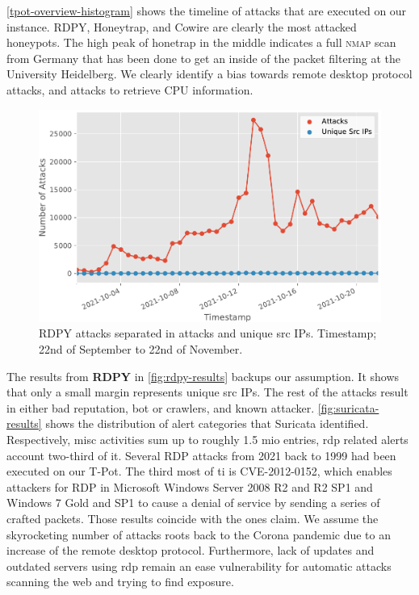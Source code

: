 \autoref{tpot-overview-histogram} shows the timeline of attacks that are executed on our instance.
RDPY, Honeytrap, and Cowire are clearly the most attacked honeypots.
The high peak of honetrap in the middle indicates a full \textsc{nmap} scan from Germany that has been done to get an inside of the packet filtering at the University Heidelberg.
We clearly identify a bias towards remote desktop protocol attacks, and attacks to retrieve CPU information. %

\begin{figure}[ht]
    \centering
    \includegraphics[width=\textwidth]{figures/tpot-rdpy-port.pdf}
    \caption[RDPY results of T-Pot]{RDPY attacks separated in attacks and unique src IPs. Timestamp; 22nd of September to 22nd of November.}
    \label{fig:rdpy-results}
\end{figure}

The results from \textbf{RDPY} in \autoref{fig:rdpy-results} backups our assumption.
It shows that only a small margin represents unique src IPs.
The rest of the attacks result in either bad reputation, bot or crawlers, and known attacker.
\autoref{fig:suricata-results} shows the distribution of alert categories that Suricata identified.
Respectively, misc activities sum up to roughly 1.5 mio entries, \ac{rdp} related alerts account two-third of it.
Several RDP attacks from 2021 back to 1999 had been executed on our T-Pot.
The third most of ti is CVE-2012-0152, which enables attackers for RDP in Microsoft Windows Server 2008 R2 and R2 SP1 and Windows 7 Gold and SP1 to cause a denial of service by sending a series of crafted packets.
Those results coincide with the ones \citet{Kelly2021} claim.
We assume the skyrocketing number of attacks roots back to the Corona pandemic due to an increase of the remote desktop protocol.
Furthermore, lack of updates and outdated servers using \ac{rdp} remain an ease vulnerability for automatic attacks scanning the web and trying to find exposure.

